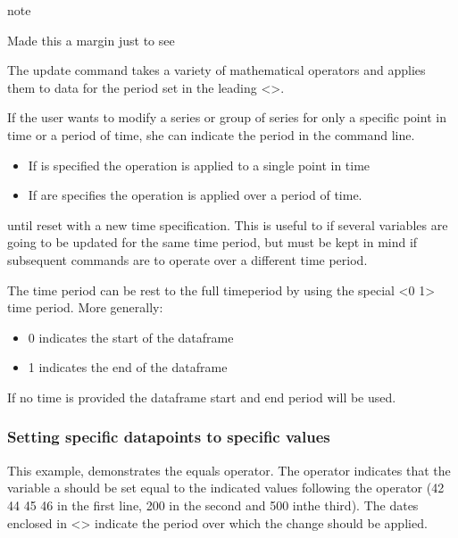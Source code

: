 \documentclass[letterpaper,10pt,english]{jupyterBook}
\begin{document}
\begin{sphinxadmonition}{note}{}

\sphinxAtStartPar
Made this a margin just to see

\sphinxAtStartPar
The update command takes a variety of mathematical operators  and applies them to data for the period set in the leading <>.

\sphinxAtStartPar
If the user wants to modify a series or group of series for only a specific point in time or a period of time, she can indicate the period in the command line.
\begin{itemize}
\item {} 
\sphinxAtStartPar
If  is specified the operation is applied to a single point in time

\item {} 
\sphinxAtStartPar
If   are specifies the operation is applied over a period of time.

\end{itemize}

\sphinxAtStartPar
{} until re\sphinxhyphen{}set with a new time specification. This is useful to if several variables are going to be updated for the same time period, but must be kept in mind if subsequent commands are to operate over a different time period.

\sphinxAtStartPar
The time period can be rest to the full time\sphinxhyphen{}period by using the special <\sphinxhyphen{}0 \sphinxhyphen{}1> time period.  More generally:
\begin{itemize}
\item {} 
\sphinxAtStartPar
\sphinxhyphen{}0 indicates the start of the dataframe

\item {} 
\sphinxAtStartPar
\sphinxhyphen{}1 indicates the end of the dataframe

\end{itemize}

\sphinxAtStartPar
If no time is provided the dataframe start and end period will be used.
\end{sphinxadmonition}


\subsubsection{Setting specific datapoints to specific values}
\label{\detokenize{content/04_PythonEssentials/UpdateCommand:setting-specific-datapoints-to-specific-values}}
\sphinxAtStartPar
This example, demonstrates the equals operator.  The \sphinxcode{\sphinxupquote{=}} operator indicates that the variable a should be set equal to the indicated values following the \sphinxcode{\sphinxupquote{=}} operator (42 44 45 46 in the first line, 200 in the second and 500 inthe third). The dates enclosed in <> indicate the period over which the change should be applied.
\end{document}
